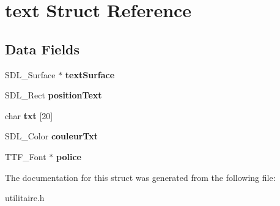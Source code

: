 \hypertarget{structtext}{}\section{text Struct Reference}
\label{structtext}
\subsection*{Data Fields}
\begin{DoxyCompactItemize}
\item 
S\+D\+L\+\_\+\+Surface $\ast$ {\bfseries text\+Surface}\hypertarget{structtext_a1a9992f493ebd8946dc5a736d65e8213}{}\label{structtext_a1a9992f493ebd8946dc5a736d65e8213}

\item 
S\+D\+L\+\_\+\+Rect {\bfseries position\+Text}\hypertarget{structtext_a01cc24369eccbe9ccb68af9a748315d3}{}\label{structtext_a01cc24369eccbe9ccb68af9a748315d3}

\item 
char {\bfseries txt} \mbox{[}20\mbox{]}\hypertarget{structtext_afd7610607c0ade6ed450f86e275ddce5}{}\label{structtext_afd7610607c0ade6ed450f86e275ddce5}

\item 
S\+D\+L\+\_\+\+Color {\bfseries couleur\+Txt}\hypertarget{structtext_a0f3134d4dbc64c9b28fa625fb627f9c5}{}\label{structtext_a0f3134d4dbc64c9b28fa625fb627f9c5}

\item 
T\+T\+F\+\_\+\+Font $\ast$ {\bfseries police}\hypertarget{structtext_aec9ba02a1c093b1db8aa0f16ac092459}{}\label{structtext_aec9ba02a1c093b1db8aa0f16ac092459}

\end{DoxyCompactItemize}


The documentation for this struct was generated from the following file\+:\begin{DoxyCompactItemize}
\item 
utilitaire.\+h\end{DoxyCompactItemize}
